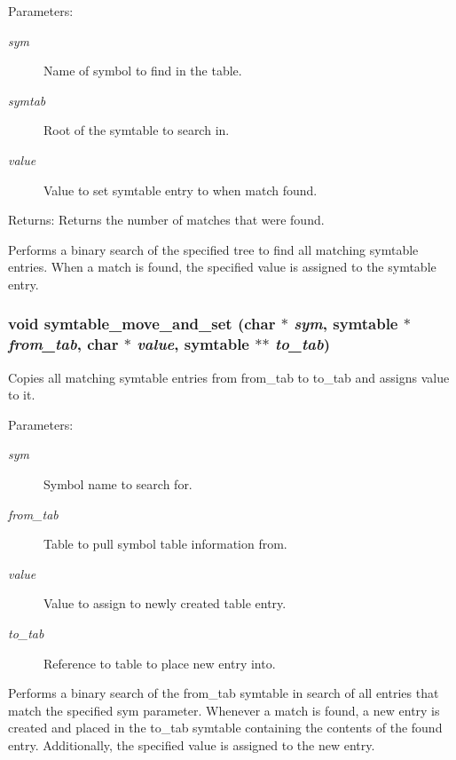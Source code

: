 \begin{Desc}
\item[Parameters:]
\begin{description}
\item[{\em sym}]Name of symbol to find in the table. \item[{\em symtab}]Root of the symtable to search in. \item[{\em value}]Value to set symtable entry to when match found.\end{description}
\end{Desc}
\begin{Desc}
\item[Returns:]Returns the number of matches that were found.\end{Desc}
Performs a binary search of the specified tree to find all matching symtable entries. When a match is found, the specified value is assigned to the symtable entry. 
\subsubsection{\setlength{\rightskip}{0pt plus 5cm}void symtable\_\-move\_\-and\_\-set (char $\ast$ {\em sym}, {\bf symtable} $\ast$ {\em from\_\-tab}, char $\ast$ {\em value}, {\bf symtable} $\ast$$\ast$ {\em to\_\-tab})}\label{symtable_8h_a2}


Copies all matching symtable entries from from\_\-tab to to\_\-tab and assigns value to it.

\begin{Desc}
\item[Parameters:]
\begin{description}
\item[{\em sym}]Symbol name to search for. \item[{\em from\_\-tab}]Table to pull symbol table information from. \item[{\em value}]Value to assign to newly created table entry. \item[{\em to\_\-tab}]Reference to table to place new entry into.\end{description}
\end{Desc}
Performs a binary search of the from\_\-tab symtable in search of all entries that match the specified sym parameter. Whenever a match is found, a new entry is created and placed in the to\_\-tab symtable containing the contents of the found entry. Additionally, the specified value is assigned to the new entry. 
